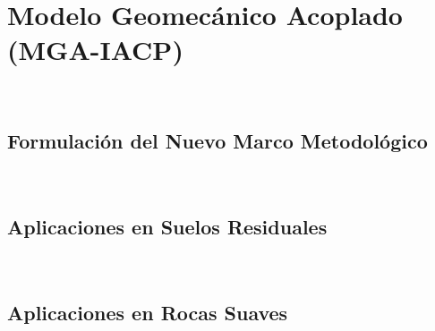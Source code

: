 %





\chapter{Modelo Geomecánico Acoplado (MGA-IACP)}~\hypertarget{ch:chapter_09}{}
\label{ch:chapter_09}

\lipsum[1-2]


\section{Formulación del Nuevo Marco Metodológico}~\hypertarget{sec:sec910}{}
\label{sec:sec910}


\section{Aplicaciones en Suelos Residuales}~\hypertarget{sec:sec920}{}
\label{sec:sec920}



\section{Aplicaciones en Rocas Suaves}~\hypertarget{sec:sec930}{}
\label{sec:sec930}




